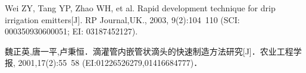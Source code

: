 \begin{achievelist}
    \item Wei ZY, Tang YP, Zhao WH, et al. Rapid development technique for drip irrigation emitters[J]. RP Journal,UK., 2003, 9(2):104~110 (SCI: 000350930600051; EI: 03187452127).
    \item 魏正英,唐一平,卢秉恒．滴灌管内嵌管状滴头的快速制造方法研究[J]．农业工程学报, 2001,17(2):55~58 (EI:01226526279,01416684777)．
    \item 
    \item 
    \item 
    \item 
    \item 
    \item 
    \item 
    \item 
    \item 
    \item 
    \item 
    \item 
    \item 
    \item 
    \item 
    \item 
    \item 
    \item 
    \item 
    \item 
    \item 
    \item 
    \item 
    \item 
    \item 
    \item 
    \item 
    \item 
\end{achievelist}